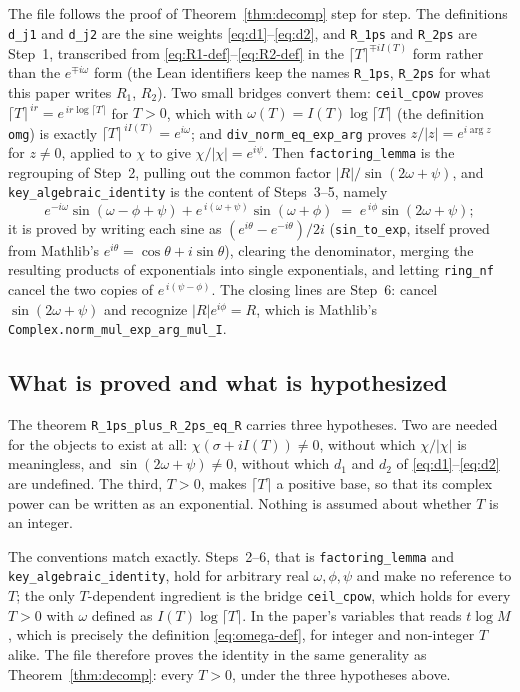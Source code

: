 \documentclass[11pt]{article}
\theoremstyle{definition}
\begin{document}
The file follows the proof of Theorem~\ref{thm:decomp} step for step. The
definitions \texttt{d\_j1} and \texttt{d\_j2} are the sine weights
\eqref{eq:d1}--\eqref{eq:d2}, and \texttt{R\_1ps} and \texttt{R\_2ps} are Step~1,
transcribed from \eqref{eq:R1-def}--\eqref{eq:R2-def} in the
$\lceil T\rceil^{\mp iI(T)}$ form rather than the $e^{\mp i\omega}$ form
(the Lean identifiers keep the names \texttt{R\_1ps}, \texttt{R\_2ps} for
what this paper writes $R_1$, $R_2$).
Two small bridges convert them: \texttt{ceil\_cpow} proves
$\lceil T\rceil^{\,ir}=e^{\,ir\log\lceil T\rceil}$ for $T>0$, which with
$\omega(T)=I(T)\log\lceil T\rceil$ (the definition \texttt{omg}) is exactly
$\lceil T\rceil^{\,iI(T)}=e^{i\omega}$; and
\texttt{div\_norm\_eq\_exp\_arg} proves $z/|z|=e^{i\arg z}$ for $z\neq0$, applied
to $\chi$ to give $\chi/|\chi|=e^{i\psi}$. Then
\texttt{factoring\_lemma} is the regrouping of Step~2, pulling out the common
factor $|R|/\sin(2\omega+\psi)$, and
\texttt{key\_algebraic\_identity} is the content of Steps~3--5, namely
\begin{equation}\label{eq:lean-key}
e^{-i\omega}\sin(\omega-\phi+\psi)+e^{\,i(\omega+\psi)}\sin(\omega+\phi)
\;=\;
e^{\,i\phi}\sin(2\omega+\psi);
\end{equation}
it is proved by writing each sine as
$(e^{i\theta}-e^{-i\theta})/2i$ (\texttt{sin\_to\_exp}, itself proved from
Mathlib's $e^{i\theta}=\cos\theta+i\sin\theta$), clearing the denominator,
merging the resulting products of exponentials into single exponentials, and
letting \texttt{ring\_nf} cancel the two copies of $e^{\,i(\psi-\phi)}$. The
closing lines are Step~6: cancel $\sin(2\omega+\psi)$ and recognize
$|R|e^{i\phi}=R$, which is Mathlib's
\texttt{Complex.norm\_mul\_exp\_arg\_mul\_I}.

\subsection{What is proved and what is hypothesized}

The theorem \texttt{R\_1ps\_plus\_R\_2ps\_eq\_R} carries three hypotheses. Two are
needed for the objects to exist at all: $\chi(\sigma+iI(T))\neq0$, without which
$\chi/|\chi|$ is meaningless, and $\sin(2\omega+\psi)\neq0$, without which $d_1$
and $d_2$ of \eqref{eq:d1}--\eqref{eq:d2} are undefined. The third, $T>0$, makes
$\lceil T\rceil$ a positive base, so that its complex power can be written as an
exponential. Nothing is assumed about whether $T$ is an integer.

The conventions match exactly. Steps~2--6, that is
\texttt{factoring\_lemma} and \texttt{key\_algebraic\_identity}, hold for
arbitrary real $\omega,\phi,\psi$ and make no reference to $T$; the only
$T$-dependent ingredient is the bridge \texttt{ceil\_cpow}, which holds
for every $T>0$ with $\omega$ defined as $I(T)\log\lceil T\rceil$. In the
paper's variables that reads $t\log M$, which is precisely the definition
\eqref{eq:omega-def}, for integer and non-integer $T$ alike. The file therefore proves the identity in the same
generality as Theorem~\ref{thm:decomp}: every $T>0$, under the three
hypotheses above.
\end{document}
